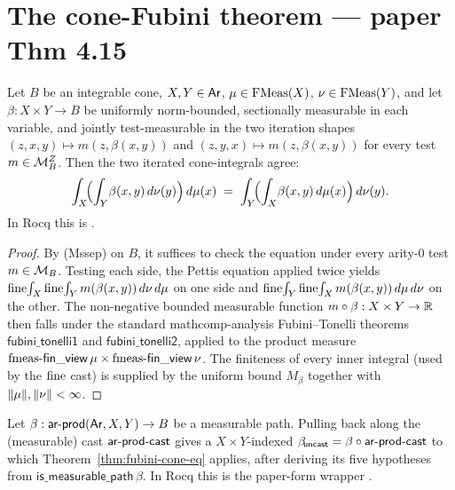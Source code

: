 \section{The cone-Fubini theorem --- paper Thm 4.15}%
\label{sec:cone-fubini}

\begin{theorem}\label{thm:fubini-cone-eq}
Let $B$ be an integrable cone, $X, Y \in \mathsf{Ar}$, $\mu \in \mathrm{FMeas}(X)$,
$\nu \in \mathrm{FMeas}(Y)$, and let $\beta : X \times Y \to B$ be uniformly
norm-bounded, sectionally measurable in each variable, and jointly
test-measurable in the two iteration shapes
$(z, x, y) \mapsto m(z, \beta(x, y))$ and
$(z, y, x) \mapsto m(z, \beta(x, y))$ for every test
$m \in \mathcal{M}^Z_B$. Then the two iterated cone-integrals agree:
\[
  \int_{X}\!\Bigl(\int_{Y}\!\beta(x, y)\,d\nu(y)\Bigr)\,d\mu(x)
  \;=\;
  \int_{Y}\!\Bigl(\int_{X}\!\beta(x, y)\,d\mu(x)\Bigr)\,d\nu(y).
\]
In Rocq this is . \rocqok
\end{theorem}

\begin{proof}
By (Mssep) on $B$, it suffices to check the equation under every
arity-$0$ test $m \in \mathcal{M}_B$. Testing each side, the Pettis
equation applied twice yields
$\mathrm{fine}\!\int_X \mathrm{fine}\!\int_Y m(\beta(x, y))\,d\nu\,d\mu$ on one
side and
$\mathrm{fine}\!\int_Y \mathrm{fine}\!\int_X m(\beta(x, y))\,d\mu\,d\nu$ on the
other. The non-negative bounded measurable function
$m \circ \beta : X \times Y \to \mathbb{R}$ then falls under the standard
mathcomp-analysis Fubini--Tonelli theorems
$\mathsf{fubini\_tonelli1}$ and $\mathsf{fubini\_tonelli2}$, applied
to the product measure $\mathrm{fmeas}\text{-}\mathsf{fin\_view}\,\mu \times
\mathrm{fmeas}\text{-}\mathsf{fin\_view}\,\nu$. The finiteness of every
inner integral (used by the $\mathrm{fine}$ cast) is supplied by the
uniform bound $M_\beta$ together with $\lVert \mu \rVert, \lVert \nu \rVert < \infty$.
\end{proof}

\begin{theorem}%
\label{thm:fubini-cone-eq-arprod}
Let $\beta : \mathsf{ar}\text{-}\mathsf{prod}(\mathsf{Ar}, X, Y) \to B$ be a
measurable path. Pulling back along the (measurable) cast
$\mathsf{ar}\text{-}\mathsf{prod\text{-}cast}$ gives a $X \times Y$-indexed
$\beta_{\!\mathsf{uncast}} = \beta \circ \mathsf{ar}\text{-}\mathsf{prod\text{-}cast}$
to which Theorem~\ref{thm:fubini-cone-eq} applies, after deriving
its five hypotheses from $\mathsf{is\_measurable\_path}\,\beta$. In
Rocq this is the paper-form wrapper
. \rocqok
\end{theorem}

